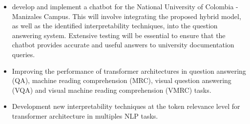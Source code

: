 \begin{itemize}
    \item develop and implement a chatbot for the National University of Colombia - Manizales Campus. This will involve integrating the proposed hybrid model, as well as the identified interpretability techniques, into the question answering system. Extensive testing will be essential to ensure that the chatbot provides accurate and useful answers to university documentation queries.
    
    \item Improving the performance of transformer architectures in question answering (QA), machine reading comprehension (MRC), visual question answering (VQA) and visual machine reading comprehension (VMRC) tasks.

    \item Development new interpretability techniques at the token relevance level for transformer architecture in multiples NLP tasks.
    \end{itemize}